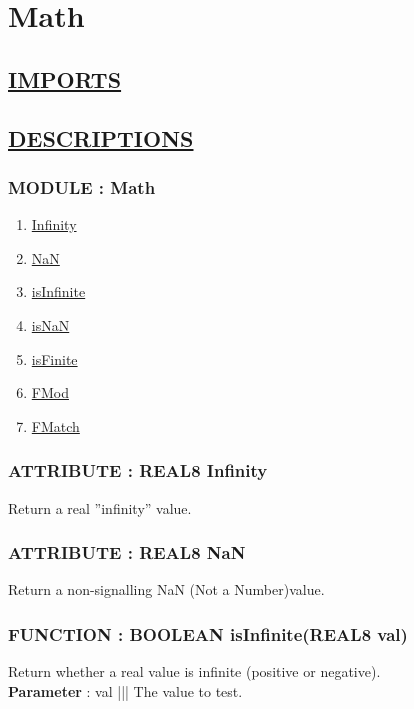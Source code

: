 \chapter*{Math}

\section*{\underline{IMPORTS}}

\section*{\underline{DESCRIPTIONS}}
\subsection*{MODULE : Math}
\hypertarget{ecldoc:Math_Math}{}
\begin{enumerate}
\item \hyperlink{ecldoc:Math_math.infinity}{Infinity}
\item \hyperlink{ecldoc:Math_math.nan}{NaN}
\item \hyperlink{ecldoc:Math_math.isinfinite}{isInfinite}
\item \hyperlink{ecldoc:Math_math.isnan}{isNaN}
\item \hyperlink{ecldoc:Math_math.isfinite}{isFinite}
\item \hyperlink{ecldoc:Math_math.fmod}{FMod}
\item \hyperlink{ecldoc:Math_math.fmatch}{FMatch}
\end{enumerate}
\subsection*{ATTRIBUTE : REAL8 Infinity}
\hypertarget{ecldoc:Math_math.infinity}{}
Return a real ''infinity'' value. \\
\subsection*{ATTRIBUTE : REAL8 NaN}
\hypertarget{ecldoc:Math_math.nan}{}
Return a non-signalling NaN (Not a Number)value. \\
\subsection*{FUNCTION : BOOLEAN isInfinite(REAL8 val)}
\hypertarget{ecldoc:Math_math.isinfinite}{}
Return whether a real value is infinite (positive or negative). \\
\textbf{Parameter} : val ||| The value to test. \\
